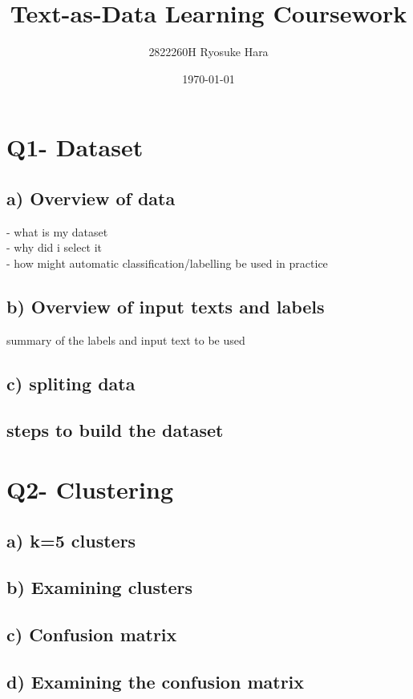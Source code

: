 \documentclass[a4paper,11pt]{article}
\begin{document}
\title{Text-as-Data Learning Coursework}
\author{2822260H Ryosuke Hara}
\date{\today}
\maketitle

\section{Q1- Dataset}
\subsection{a) Overview of data}%
- what is my dataset  \\
- why did i select it  \\
- how might automatic classification/labelling be used in practice \\

\subsection{b) Overview of input texts and labels}
summary of the labels and input text to be used \\

\subsection{c) spliting data}
\subsection{steps to build the dataset}

\section{Q2- Clustering}
\subsection{a) k=5 clusters}
\subsection{b) Examining clusters}
\subsection{c) Confusion matrix}
\subsection{d) Examining the confusion matrix}
\end{document}
